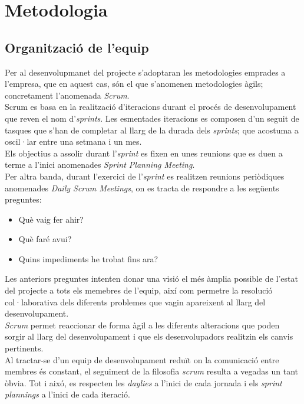 \section{Metodologia}
\subsection{Organització de l'equip}

Per al desenvolupmanet del projecte s'adoptaran les metodologies emprades a l'empresa, que en aquest cas, són el que s'anomenen metodologies àgils; concretament l'anomenada \textit{Scrum}\cite{scrum}.\\
Scrum es basa en la realització d'iteracions durant el procés de desenvolupament que reven el nom d'\textit{sprints}. Les esmentades iteracions es composen d'un seguit de tasques que s'han de completar al llarg de la durada dels \textit{sprints}; que acostuma a oscil·lar entre una setmana i un mes.\\
Els objectius a assolir durant l'\textit{sprint} es fixen en unes reunions que es duen a terme a l'inici anomenades \textit{Sprint Planning Meeting}.\\
Per altra banda, durant l'exercici de l'\textit{sprint} es realitzen reunions periòdiques anomenades \textit{Daily Scrum Meetings}, on es tracta de respondre a les següents preguntes:

\begin{itemize}
	\item Què vaig fer ahir?
	\item Què faré avui?
	\item Quins impediments he trobat fins ara?
\end{itemize}
Les anteriors preguntes intenten donar una visió el més àmplia possible de l'estat del projecte a tots els memebres de l'equip, així com permetre la resolució col·laborativa dels diferents problemes que vagin apareixent al llarg del desenvolupament.\\
\textit{Scrum} permet reaccionar de forma àgil a les diferents alteracions que poden sorgir al llarg del desenvolupament i que els desenvolupadors realitzin els canvis pertinents.\\
Al tractar-se d'un equip de desenvolupament reduït on la comunicació entre membres és constant, el seguiment de la filosofia \textit{scrum} resulta a vegadas un tant òbvia. Tot i aixó, es respecten les \textit{daylies} a l'inici de cada jornada i els \textit{sprint plannings} a l'inici de cada iteració.

